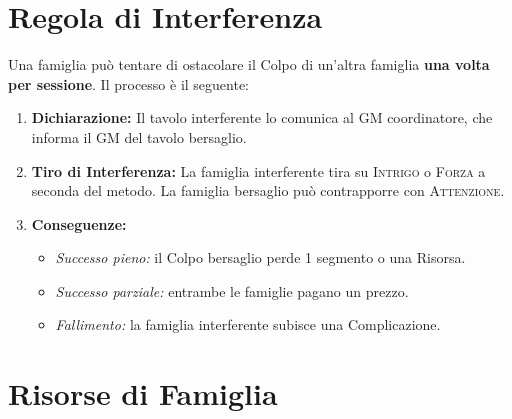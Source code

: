 \section{Regola di Interferenza}
\label{sec:interferenza}


Una famiglia può tentare di ostacolare il Colpo di un'altra famiglia
\textbf{una volta per sessione}. Il processo è il seguente:

\begin{enumerate}
  \item \textbf{Dichiarazione:} Il tavolo interferente lo comunica al GM coordinatore,
        che informa il GM del tavolo bersaglio.
  \item \textbf{Tiro di Interferenza:} La famiglia interferente tira su
        \textsc{Intrigo} o \textsc{Forza} a seconda del metodo.
        La famiglia bersaglio può contrapporre con \textsc{Attenzione}.
  \item \textbf{Conseguenze:}
  \begin{itemize}
    \item \textit{Successo pieno:} il Colpo bersaglio perde 1 segmento o una Risorsa.
    \item \textit{Successo parziale:} entrambe le famiglie pagano un prezzo.
    \item \textit{Fallimento:} la famiglia interferente subisce una Complicazione.
  \end{itemize}
\end{enumerate}

\section{Risorse di Famiglia}
\label{sec:risorse}


